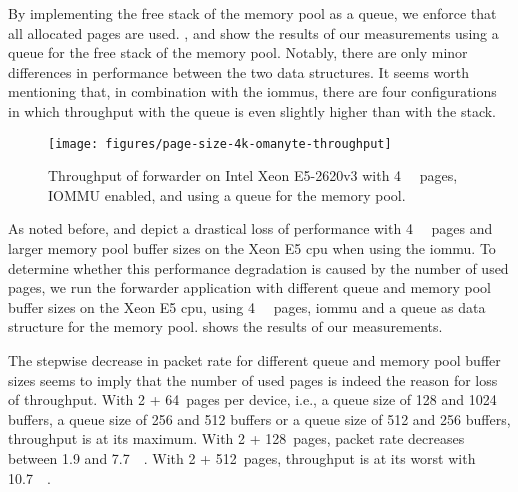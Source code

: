 By implementing the free stack of the memory pool as a queue, we enforce that
all allocated pages are used. ,
 and
 show the results of our measurements
using a queue for the free stack of the memory pool. Notably, there are only
minor differences in performance between the two data structures. It seems worth
mentioning that, in combination with the \acp{iommu}, there are four
configurations in which throughput with the queue is even slightly higher than
with the stack.

\begin{figure}%
    \centering
    \texttt{[image: figures/page-size-4k-omanyte-throughput]}

    \caption{Throughput of forwarder on Intel Xeon E5-2620v3 with
    \SI{4}{\kibi\byte} pages, IOMMU enabled, and using a queue for the memory
    pool.}
    \label{fig:page-size-4k-omanyte}
\end{figure}

As noted before,  and
 depict a drastical loss of performance
with \SI{4}{\kibi\byte} pages and larger memory pool buffer sizes on the Xeon E5
\ac{cpu} when using the \ac{iommu}. To determine whether this performance
degradation is caused by the number of used pages, we run the forwarder
application with different queue and memory pool buffer sizes on the Xeon E5
\ac{cpu}, using \SI{4}{\kibi\byte} pages, \ac{iommu} and a queue as data
structure for the memory pool.  shows the
results of our measurements.

The stepwise decrease in packet rate for different queue and memory pool buffer
sizes seems to imply that the number of used pages is indeed the reason for loss
of throughput. With 2 + 64~pages per device, i.e., a queue size of 128 and
\SI{1024}{\byte} buffers, a queue size of 256 and \SI{512}{\byte} buffers or a
queue size of 512 and \SI{256}{\byte} buffers, throughput is at its maximum.
With 2 + 128~pages, packet rate decreases between 1.9 and \SI{7.7}{\mega\pps}.
With 2 + 512~pages, throughput is at its worst with \SI{10.7}{\mega\pps}.

